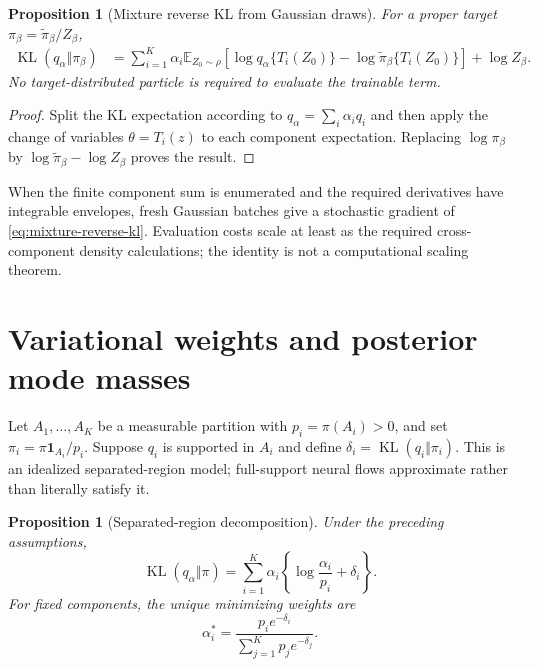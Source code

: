 \documentclass[11pt]{article}
\newtheorem{proposition}[theorem]{Proposition}
\theoremstyle{definition}
\theoremstyle{remark}
\newcommand{\E}{\mathbb{E}}
\newcommand{\KL}{\operatorname{KL}}
\newcommand{\1}{\mathbf{1}}
\begin{document}
\begin{proposition}[Mixture reverse KL from Gaussian draws]
\label{prop:mixture-reverse-kl}
For a proper target $\pi_\beta=\widetilde\pi_\beta/Z_\beta$,
\begin{align}
 \KL(q_\alpha\Vert\pi_\beta)
 &=\sum_{i=1}^K\alpha_i\E_{Z_0\sim\rho}\left[
    \log q_\alpha\{T_i(Z_0)\}
    -\log\widetilde\pi_\beta\{T_i(Z_0)\}
   \right]+\log Z_\beta.
 \label{eq:mixture-reverse-kl}
\end{align}
No target-distributed particle is required to evaluate the trainable term.
\end{proposition}

\begin{proof}
Split the KL expectation according to
$q_\alpha=\sum_i\alpha_iq_i$ and then apply the change of variables
$\theta=T_i(z)$ to each component expectation.  Replacing
$\log\pi_\beta$ by $\log\widetilde\pi_\beta-\log Z_\beta$ proves the result.
\end{proof}

When the finite component sum is enumerated and the required derivatives have
integrable envelopes, fresh Gaussian batches give a stochastic gradient of
\eqref{eq:mixture-reverse-kl}.  Evaluation costs scale at least as the required
cross-component density calculations; the identity is not a computational
scaling theorem.

\section{Variational weights and posterior mode masses}

Let $A_1,\ldots,A_K$ be a measurable partition with
$p_i=\pi(A_i)>0$, and set
$\pi_i=\pi\1_{A_i}/p_i$.  Suppose $q_i$ is supported in $A_i$ and define
$\delta_i=\KL(q_i\Vert\pi_i)$.  This is an idealized separated-region model;
full-support neural flows approximate rather than literally satisfy it.

\begin{proposition}[Separated-region decomposition]
\label{prop:separated-weights}
Under the preceding assumptions,
\begin{equation}
 \KL(q_\alpha\Vert\pi)
 =\sum_{i=1}^K\alpha_i
   \left\{\log\frac{\alpha_i}{p_i}+\delta_i\right\}.
 \label{eq:separated-kl}
\end{equation}
For fixed components, the unique minimizing weights are
\begin{equation}
 \alpha_i^*
 =\frac{p_i e^{-\delta_i}}
        {\sum_{j=1}^Kp_j e^{-\delta_j}}.
 \label{eq:biased-mixture-weight}
\end{equation}
\end{proposition}
\end{document}
